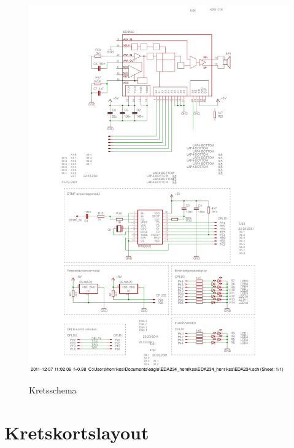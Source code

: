 \documentclass[a4paper,11pt]{article}
\begin{document}
		\begin{figure}[ht!tb]
		  \centering
		      \includegraphics[scale=0.7, angle=0]{schema.png}
			\label{fig:schema}
		  	\caption{Kretsschema}
		\end{figure}

	\section{Kretskortslayout}
\end{document}
